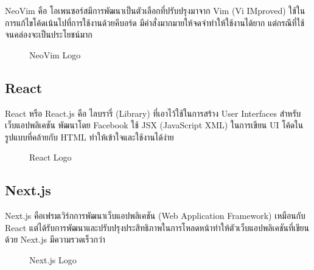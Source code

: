 NeoVim คือ โอเพนซอร์สมีการพัฒนาเป็นตัวเลือกที่ปรับปรุงมาจาก Vim (Vi IMproved) ใช้ในการแก้ไขโค้ดเน้นไปที่การใช้งานด้วยคีบอร์ด มีคำสั่งมากมายให้จดจำทำให้ใช้งานได้ยาก แต่กรณีที่ใช้จนคล่องจะเป็นประโยชน์มาก

\begin{figure}[H]
    \centering
    \caption{NeoVim Logo}
    \label{fig:neovim}
\end{figure}

\newpage




\subsection{React}

React หรือ React.js คือ ไลบรารี่ (Library) ที่เอาไว้ใช้ในการสร้าง User Interfaces สำหรับเว็บแอปพลิเคชัน พัฒนาโดย Facebook ใช้ JSX (JavaScript XML) ในการเขียน UI โค้ดในรูปแบบที่คล้ายกับ HTML ทำให้เข้าใจและใช้งานได้ง่าย \cite{ReadyToReactWithJSX}

\begin{figure}[H]
    \centering
    \caption{React Logo}
    \label{fig:react}
\end{figure}

\subsection{Next.js}

Next.js คือเฟรมเวิร์กการพัฒนาเว็บแอปพลิเคชัน (Web Application Framework) เหมือนกับ React แต่ได้รับการพัฒนาและปรับปรุงประสิทธิภาพในการโหลดหน้าทำให้ตัวเว็บแอปพลิเคชันที่เขียนด้วย Next.js มีความรวดเร็วกว่า \cite{WhatIsNextjs}

\begin{figure}[H]
    \centering
    \caption{Next.js Logo}
    \label{fig:nextjs}
\end{figure}

